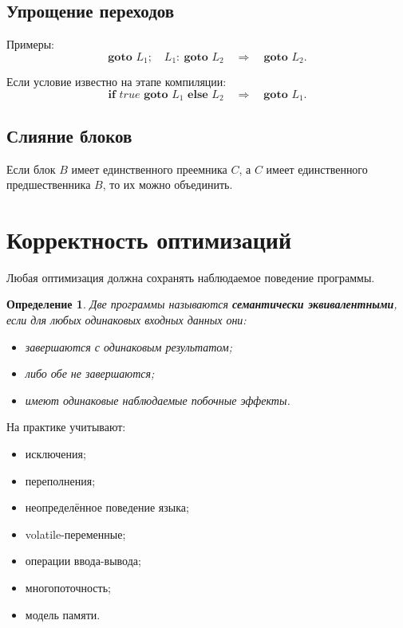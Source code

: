 \documentclass[12pt,a4paper]{article}
\newtheorem{definition}{Определение}
\begin{document}
\subsection{Упрощение переходов}

Примеры:
\[
\textbf{goto } L_1;\quad L_1:\ \textbf{goto } L_2
\quad \Rightarrow \quad
\textbf{goto } L_2.
\]

Если условие известно на этапе компиляции:
\[
\textbf{if } true \textbf{ goto } L_1 \textbf{ else } L_2
\quad \Rightarrow \quad
\textbf{goto } L_1.
\]

\subsection{Слияние блоков}

Если блок $B$ имеет единственного преемника $C$, а $C$ имеет единственного предшественника $B$, то их можно объединить.

\section{Корректность оптимизаций}

Любая оптимизация должна сохранять наблюдаемое поведение программы.

\begin{definition}
Две программы называются \textbf{семантически эквивалентными}, если для любых одинаковых входных данных они:
\begin{itemize}
    \item завершаются с одинаковым результатом;
    \item либо обе не завершаются;
    \item имеют одинаковые наблюдаемые побочные эффекты.
\end{itemize}
\end{definition}

На практике учитывают:
\begin{itemize}
    \item исключения;
    \item переполнения;
    \item неопределённое поведение языка;
    \item volatile-переменные;
    \item операции ввода-вывода;
    \item многопоточность;
    \item модель памяти.
\end{itemize}
\end{document}
